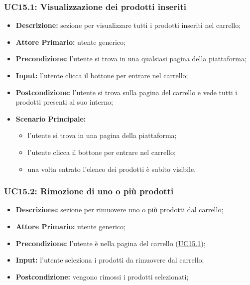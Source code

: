         \subsubsection{UC15.1: Visualizzazione dei prodotti inseriti}
        \label{sec:UC15.1}
        \begin{itemize}
            \item \textbf{Descrizione:} sezione per visualizzare tutti i prodotti inseriti nel carrello;
            \item \textbf{Attore Primario:} utente generico;
            \item \textbf{Precondizione:}  l'utente si trova in una qualsiasi pagina della piattaforma;
            \item \textbf{Input:} l'utente clicca il bottone per entrare nel carrello;
            \item \textbf{Postcondizione:} l'utente si trova sulla pagina del carrello e vede tutti i prodotti presenti al suo interno;
            \item \textbf{Scenario Principale:}
                \begin{itemize}
                    \item l'utente si trova in una pagina della piattaforma;
                    \item l'utente clicca il bottone per entrare nel carrello;
                    \item una volta entrato l'elenco dei prodotti è subito visibile.
                \end{itemize}
        \end{itemize}
        \subsubsection{UC15.2: Rimozione di uno o più prodotti}
        \begin{itemize}
            \item \textbf{Descrizione:} sezione per rimuovere uno o più prodotti dal carrello;
            \item \textbf{Attore Primario:} utente generico;
            \item \textbf{Precondizione:} l'utente è nella pagina del carrello (\hyperref[sec:UC15.1]{\underline{UC15.1}});
            \item \textbf{Input:} l'utente seleziona i prodotti da rimuovere dal carrello;
            \item \textbf{Postcondizione:} vengono rimossi i prodotti selezionati;
        \end{itemize}

